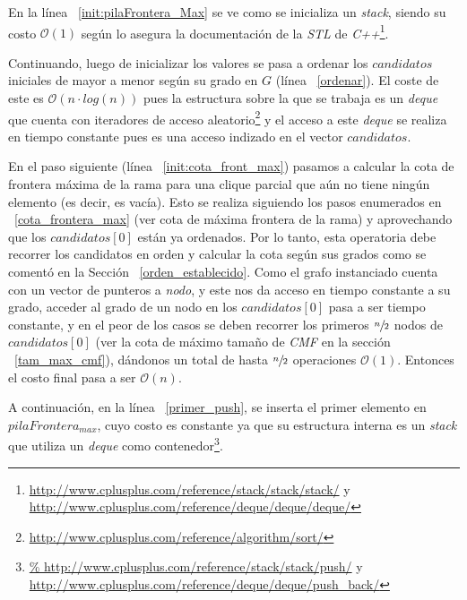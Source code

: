 \par En la l\'inea ~\ref{init:pilaFrontera_Max} se ve como se inicializa un \emph{stack},
    siendo su costo $\mathcal O(1)$ seg\'un lo asegura la documentaci\'on de la \emph{STL}
    de \emph{C++}\footnote{\url{http://www.cplusplus.com/reference/stack/stack/stack/} y
    \url{http://www.cplusplus.com/reference/deque/deque/deque/}}.

\par Continuando, luego de inicializar los valores se pasa a ordenar los $candidatos$
    iniciales de mayor a menor seg\'un su grado en $G$ (l\'inea ~\ref{ordenar}).
    El coste de este es $\mathcal O(n \cdot log(n))$ pues la estructura sobre la que
    se trabaja es un \emph{deque} que cuenta con iteradores de acceso aleatorio\footnote{%
    \url{http://www.cplusplus.com/reference/algorithm/sort/}} y el acceso a este
    \emph{deque} se realiza en tiempo constante pues es una acceso indizado en
    el vector $candidatos$.

\par En el paso siguiente (l\'inea ~\ref{init:cota_front_max}) pasamos a calcular
    la cota de frontera m\'axima de la rama para una clique parcial que a\'un
    no tiene ning\'un elemento (es decir, es vac\'ia). Esto se realiza siguiendo
    los pasos enumerados en ~\ref{cota_frontera_max} (ver cota de m\'axima
    frontera de la rama) y aprovechando que los
    $candidatos[0]$ est\'an ya ordenados. Por lo tanto, esta operatoria
    debe recorrer los candidatos en orden y calcular la cota seg\'un sus
    grados como se coment\'o en la Secci\'on ~\ref{orden_establecido}. Como
    el grafo instanciado cuenta con un vector de punteros a \emph{nodo}, y este
    nos da acceso en tiempo constante a su grado, acceder al grado de un nodo
    en los $candidatos[0]$ pasa a ser tiempo constante, y en el peor de los
    casos se deben recorrer los primeros $\sfrac{n}{2}$ nodos de $candidatos[0]$
    (ver la cota de m\'aximo tama\~no de \emph{CMF} en la secci\'on ~\ref{tam_max_cmf}),
    d\'andonos un total de hasta $\sfrac{n}{2}$ operaciones $\mathcal O(1)$. Entonces
    el costo final pasa a ser $\mathcal O(n)$.

\par A continuaci\'on, en la l\'inea ~\ref{primer_push}, se inserta el primer elemento
    en $pilaFrontera_{max}$, cuyo costo es constante ya que su estructura interna
    es un \emph{stack} que utiliza un \emph{deque} como contenedor\footnote{\url{%
    http://www.cplusplus.com/reference/stack/stack/push/} y \url{http://www.cplusplus.com/reference/deque/deque/push_back/}}.

